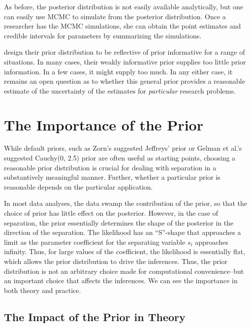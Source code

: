 \documentclass[12pt]{article}
\begin{document}
As before, the posterior distribution is not easily available analytically, but one can easily use MCMC to simulate from the posterior distribution. Once a researcher has the MCMC simulations, she can obtain the point estimates and credible intervals for parameters by summarizing the simulations. 

\cite{Gelmanetal2008} design their prior distribution to be reflective of prior informative for a range of situations. In many cases, their weakly informative prior supplies too little prior information. In a few cases, it might supply too much. In any either case, it remains an open question as to whether this general prior provides a reasonable estimate of the uncertainty of the estimates for \emph{particular} research problems.

\section*{The Importance of the Prior}

While default priors, such as Zorn's suggested Jeffreys' prior or Gelman et al.'s suggested Cauchy(0, 2.5) prior are often useful as starting points, choosing a reasonable prior distribution is crucial for dealing with separation in a substantively meaningful manner. Further, whether a particular prior is reasonable depends on the particular application.

In most data analyses, the data swamp the contribution of the prior, so that the choice of prior has little effect on the posterior. However, in the case of separation, the prior essentially determines the shape of the posterior in the direction of the separation. The likelihood has an ``S''-shape that approaches a limit as the parameter coefficient for the separating variable $s_i$ approaches infinity. Thus, for large values of the coefficient, the likelihood is essentially flat, which allows the prior distribution to drive the inferences. Thus, the prior distribution is not an arbitrary choice made for computational convenience--but an important choice that affects the inferences. We can see the importance in both theory and practice.

\subsection*{The Impact of the Prior in Theory}
\end{document}
